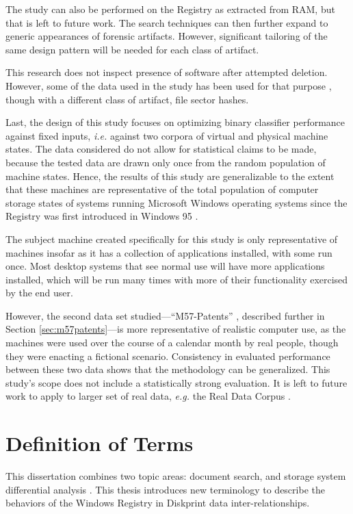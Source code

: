 \documentclass[11pt]{ucthesis}
\theoremstyle{plain}
\theoremstyle{definition}
\newcommand{\eg}{\emph{e.g.}\xspace}
\newcommand{\ie}{\emph{i.e.}\xspace}
\begin{document}
The study can also be performed on the Registry as extracted from RAM, but that is left to future work.  The search techniques can then further expand to generic appearances of forensic artifacts.  However, significant tailoring of the same design pattern will be needed for each class of artifact.

This research does not inspect presence of software after attempted deletion.  However, some of the data used in the study has been used for that purpose \cite{jones:adfsl16}, though with a different class of artifact, file sector hashes.

Last, the design of this study focuses on optimizing binary classifier performance against fixed inputs, \ie against two corpora of virtual and physical machine states.  The data considered do not allow for statistical claims to be made, because the tested data are drawn only once from the random population of machine states.  Hence, the results of this study are generalizable to the extent that these machines are representative of the total population of computer storage states of systems running Microsoft Windows operating systems since the Registry was first introduced in Windows 95 \cite{hillier:msdn96}.

The subject machine created specifically for this study is only representative of machines insofar as it has a collection of applications installed, with some run once.  Most desktop systems that see normal use will have more applications installed, which will be run many times with more of their functionality exercised by the end user.

However, the second data set studied---``M57-Patents'' \cite{woods:adfsl11}, described further in Section \ref{sec:m57patents}---is more representative of realistic computer use, as the machines were used over the course of a calendar month by real people, though they were enacting a fictional scenario.  Consistency in evaluated performance between these two data shows that the methodology can be generalized.  This study's scope does not include a statistically strong evaluation.  It is left to future work to apply to larger set of real data, \eg the Real Data Corpus \cite{garfinkel:dfrws09}.


\section{Definition of Terms}

This dissertation combines two topic areas: document search, and storage system differential analysis \cite{carrier:addison-wesley05,garfinkel:dfrws12a}.  This thesis introduces new terminology to describe the behaviors of the Windows Registry in Diskprint data inter-relationships.
\end{document}
